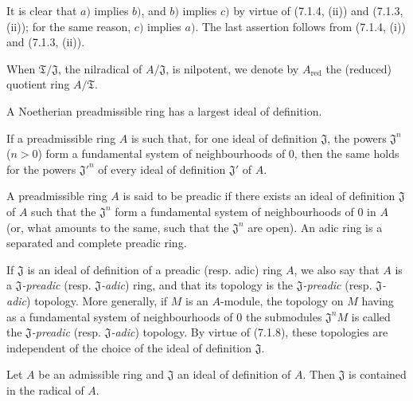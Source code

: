 It is clear that $a)$ implies $b)$, and $b)$ implies $c)$ by virtue of
(7.1.4, (ii)) and (7.1.3, (ii)); for the same reason, $c)$ implies $a)$. The
last assertion follows from (7.1.4, (i)) and (7.1.3, (ii)).

When $\mathfrak T/\mathfrak J$, the nilradical of $A/\mathfrak J$, is
nilpotent, we denote by $A_{\mathrm{red}}$ the (reduced) quotient ring
$A/\mathfrak T$.


\begin{corollary}[7.1.7]
\label{0.7.1.7}
A Noetherian preadmissible ring has a largest ideal of definition.
\end{corollary}

\begin{corollary}[7.1.8]
\label{0.7.1.8}
If a preadmissible ring $A$ is such that, for one ideal of definition
$\mathfrak J$, the powers $\mathfrak J^n$ ($n>0$) form a fundamental
system of neighbourhoods of $0$, then the same holds for the powers
${\mathfrak J'}^n$ of every ideal of definition $\mathfrak J'$ of $A$.
\end{corollary}

\begin{definition}[7.1.9]
\label{0.7.1.9}
A preadmissible ring $A$ is said to be preadic if there exists an ideal of
definition $\mathfrak J$ of $A$ such that the $\mathfrak J^n$ form a
fundamental system of neighbourhoods of $0$ in $A$ (or, what amounts to the same, such that
the $\mathfrak J^n$ are open). An adic ring is a separated and complete
preadic ring.
\end{definition}

If $\mathfrak J$ is an ideal of definition of a preadic (resp.
adic) ring $A$, we also say that $A$ is a
\emph{$\mathfrak J$-preadic} (resp. \emph{$\mathfrak J$-adic}) ring, and that its
topology is the \emph{$\mathfrak J$-preadic} (resp.
\emph{$\mathfrak J$-adic}) topology. More generally, if $M$ is an $A$-module, the
topology on $M$ having as a fundamental system of neighbourhoods of $0$ the
submodules $\mathfrak J^nM$ is called the
\emph{$\mathfrak J$-preadic} (resp. \emph{$\mathfrak J$-adic}) topology. By virtue
of (7.1.8), these topologies are independent of the choice of the ideal of definition
$\mathfrak J$.

\begin{proposition}[7.1.10]
\label{0.7.1.10}
Let $A$ be an admissible ring and $\mathfrak J$ an ideal of definition of $A$.
Then $\mathfrak J$ is contained in the radical of $A$.
\end{proposition}

